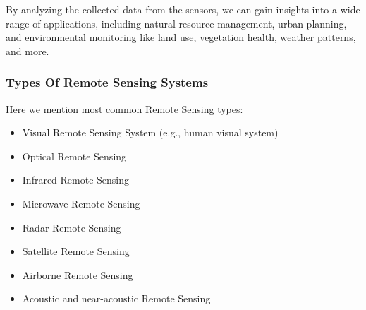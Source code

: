 By analyzing the collected data from the sensors, we can gain insights into a wide range of applications, including natural resource management, urban planning, and environmental monitoring like land use, vegetation health, weather patterns, and more.\cite{mather2016classification}
\subsubsection{Types Of Remote Sensing Systems}
Here we mention most common Remote Sensing types: \cite{elachi1988spaceborne}
\begin{itemize}
	\item 	Visual Remote Sensing System (e.g., human visual system)
	\item 	Optical Remote Sensing
	\item 	Infrared Remote Sensing
	\item 	Microwave Remote Sensing
	\item 	Radar Remote Sensing
	\item 	Satellite Remote Sensing
	\item 	Airborne Remote Sensing
	\item 	Acoustic and near-acoustic Remote Sensing
\end{itemize}


